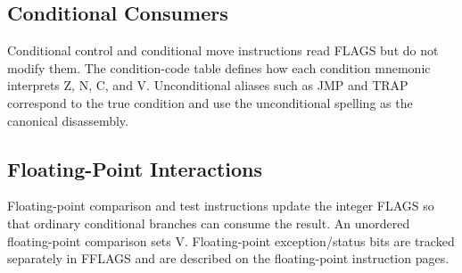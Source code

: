 \subsection{Conditional Consumers}
Conditional control and conditional move instructions read FLAGS but do not modify them. The
condition-code table defines how each condition mnemonic interprets Z, N, C, and V. Unconditional
aliases such as JMP and TRAP correspond to the true condition and use the unconditional spelling
as the canonical disassembly.

\subsection{Floating-Point Interactions}
Floating-point comparison and test instructions update the integer FLAGS so that ordinary
conditional branches can consume the result. An unordered floating-point comparison sets V.
Floating-point exception/status bits are tracked separately in FFLAGS and are described on the
floating-point instruction pages.
